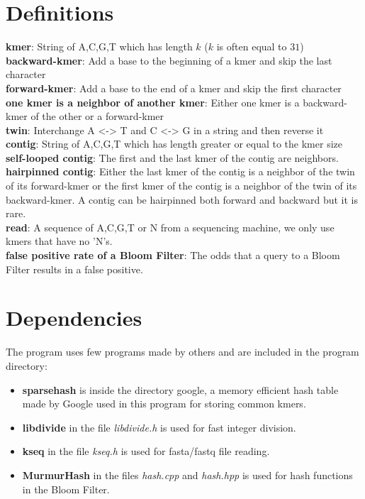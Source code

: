 \documentclass[a4paper]{report}
\renewcommand{\b}[1]{\textbf{#1}}  %
\begin{document}
\chapter{Definitions}
\b{kmer}\cite{wiki:kmer}: String of A,C,G,T which has length $k$ ($k$ is often equal to $31$) \\[2pt]
\b{backward-kmer}: Add a base to the beginning of a kmer and skip the last character\\[2pt]
\b{forward-kmer}: Add a base to the end of a kmer and skip the first character\\[2pt]
\b{one kmer is a neighbor of another kmer}: Either one kmer is a backward-kmer of the other or a forward-kmer\\[2pt]
\b{twin}: Interchange A <-> T and C <-> G in a string and then reverse it \\[2pt]
\b{contig}: String of A,C,G,T which has length greater or equal to the kmer size\\[2pt]
\b{self-looped contig}: The first and the last kmer of the contig are neighbors.\\[2pt]
\b{hairpinned contig}: Either the last kmer of the contig is a neighbor of the twin of its forward-kmer or
the first kmer of the contig is a neighbor of the twin of its backward-kmer.
A contig can be hairpinned both forward and backward but it is rare.\\[2pt]
\b{read}: A sequence of A,C,G,T or N from a sequencing machine\cite{wiki:dnaseq}, we only use kmers that
have no 'N's. \\[2pt]
\b{false positive rate of a Bloom Filter}: The odds that a query to a Bloom Filter results in a false positive.
\\[8pt]

\chapter{Dependencies}
The program uses few programs made by others and are included in the program directory:

\begin{itemize}
\item \b{sparsehash}\cite{sparsehash} is inside the directory google, a memory efficient hash table made by Google
    used in this program for storing common kmers.
\item \b{libdivide}\cite{libdivide} in the file \emph{libdivide.h} is used for fast integer division.
\item \b{kseq}\cite{kseq} in the file \emph{kseq.h} is used for fasta/fastq file reading.
\item \b{MurmurHash}\cite{smhasher} in the files \emph{hash.cpp} and \emph{hash.hpp} is used for hash functions in the Bloom Filter.
\end{itemize}
\end{document}
